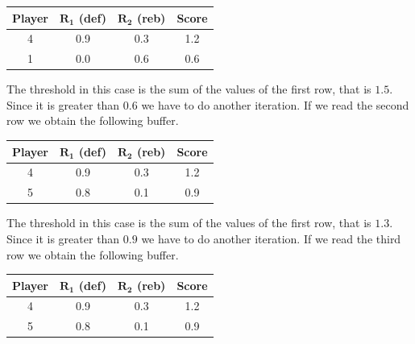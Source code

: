 \begin{enumerate}
        \begin{table}[H]
            \centering
            \begin{tabular}{c|cc|c}
            \hline
            \textbf{Player} & \textbf{$\boldsymbol{R_1}$ (def)} & \textbf{$\boldsymbol{R_2}$ (reb)} & \textbf{Score} \\ \hline
            4               & 0.9                               & 0.3                               & 1.2            \\
            1               & 0.0                               & 0.6                               & 0.6            \\ \hline
            \end{tabular}
        \end{table}
        The threshold in this case is the sum of the values of the first row, that is $1.5$. Since it is greater than $0.6$ we have to do
        another iteration. If we read the second row we obtain the following buffer. 
        \begin{table}[H]
            \centering
            \begin{tabular}{c|cc|c}
            \hline
            \textbf{Player} & \textbf{$\boldsymbol{R_1}$ (def)} & \textbf{$\boldsymbol{R_2}$ (reb)} & \textbf{Score} \\ \hline
            4               & 0.9                               & 0.3                               & 1.2            \\
            5               & 0.8                               & 0.1                               & 0.9            \\ \hline
            \end{tabular}
        \end{table}
        The threshold in this case is the sum of the values of the first row, that is $1.3$. Since it is greater than $0.9$ we have to do
        another iteration. If we read the third row we obtain the following buffer. 
        \begin{table}[H]
            \centering
            \begin{tabular}{c|cc|c}
            \hline
            \textbf{Player} & \textbf{$\boldsymbol{R_1}$ (def)} & \textbf{$\boldsymbol{R_2}$ (reb)} & \textbf{Score} \\ \hline
            4               & 0.9                               & 0.3                               & 1.2            \\
            5               & 0.8                               & 0.1                               & 0.9            \\ \hline

\end{tabular}
\end{table}
\end{enumerate}
